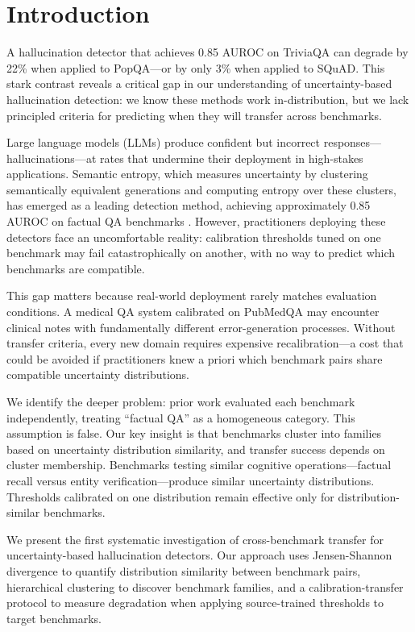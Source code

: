 \section{Introduction}

A hallucination detector that achieves 0.85 AUROC on TriviaQA can degrade by 22\% when applied to PopQA---or by only 3\% when applied to SQuAD. This stark contrast reveals a critical gap in our understanding of uncertainty-based hallucination detection: we know these methods work in-distribution, but we lack principled criteria for predicting when they will transfer across benchmarks.

Large language models (LLMs) produce confident but incorrect responses---hallucinations---at rates that undermine their deployment in high-stakes applications. Semantic entropy, which measures uncertainty by clustering semantically equivalent generations and computing entropy over these clusters, has emerged as a leading detection method, achieving approximately 0.85 AUROC on factual QA benchmarks \cite{kuhn2023semantic}. However, practitioners deploying these detectors face an uncomfortable reality: calibration thresholds tuned on one benchmark may fail catastrophically on another, with no way to predict which benchmarks are compatible.

This gap matters because real-world deployment rarely matches evaluation conditions. A medical QA system calibrated on PubMedQA may encounter clinical notes with fundamentally different error-generation processes. Without transfer criteria, every new domain requires expensive recalibration---a cost that could be avoided if practitioners knew a priori which benchmark pairs share compatible uncertainty distributions.

We identify the deeper problem: prior work evaluated each benchmark independently, treating ``factual QA'' as a homogeneous category. This assumption is false. Our key insight is that benchmarks cluster into families based on uncertainty distribution similarity, and transfer success depends on cluster membership. Benchmarks testing similar cognitive operations---factual recall versus entity verification---produce similar uncertainty distributions. Thresholds calibrated on one distribution remain effective only for distribution-similar benchmarks.

We present the first systematic investigation of cross-benchmark transfer for uncertainty-based hallucination detectors. Our approach uses Jensen-Shannon divergence to quantify distribution similarity between benchmark pairs, hierarchical clustering to discover benchmark families, and a calibration-transfer protocol to measure degradation when applying source-trained thresholds to target benchmarks.

